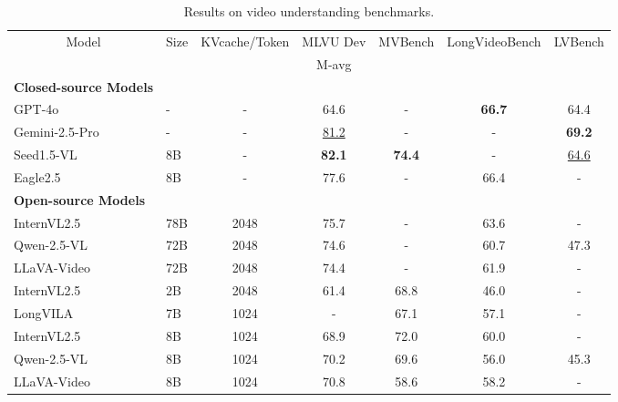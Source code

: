 \begin{table}[h]
    \caption{Results on video understanding benchmarks.} 
    \centering
    \addtolength\tabcolsep{-2.4pt}
    \small  %
    \renewcommand{\arraystretch}{0.92}  %
    \begin{tabular}{llc|c|c|c|c}
    \toprule
    \multicolumn{1}{c}{\multirow{2}{*}{Model}} & 
    \multicolumn{1}{c}{\multirow{2}{*}{Size}} & 
    \multicolumn{1}{c}{\multirow{2}{*}{KVcache/Token}} & 
    \multicolumn{1}{c|}{MLVU Dev} &  
    \multicolumn{1}{c|}{\multirow{2}{*}{MVBench}} & 
    \multicolumn{1}{c|}{\multirow{2}{*}{LongVideoBench}} & 
    \multicolumn{1}{c|}{\multirow{2}{*}{LVBench}} \\
    
    \multicolumn{1}{c}{} & \multicolumn{1}{c}{} & \multicolumn{1}{c}{} & M-avg & \multicolumn{1}{c|}{} & \multicolumn{1}{c|}{} & \multicolumn{1}{c|}{} \\ 
    \midrule
    \textbf{Closed-source Models} \\
    
    GPT-4o  & -  & - & {64.6}  & - &\textbf{66.7} & 64.4 \\
    Gemini-2.5-Pro & - & - & \underline{81.2} & - & - & \textbf{69.2} \\
    Seed1.5-VL & 8B  & - & \textbf{82.1} &\textbf{74.4} & - &  \underline{64.6} \\
    Eagle2.5 & 8B & -  & 77.6 & - & 66.4 & {-} \\
    
    \midrule
    \textbf{Open-source Models}\\ 
    
    InternVL2.5\cite{chen2025expandingperformanceboundariesopensource} & 78B & 2048  & 75.7  & - & 63.6  & {-} \\
    Qwen-2.5-VL\cite{bai2025qwen25vltechnicalreport} & 72B & 2048  & 74.6  & - & 60.7 & {47.3} \\
    LLaVA-Video\cite{zhang2024video} & 72B & 2048  & 74.4  & - & 61.9 & {-} \\
    InternVL2.5 &2B & 2048& 61.4&68.8& 46.0& - \\
    LongVILA\cite{chen2024longvila}& 7B & 1024  & - & 67.1 &57.1  & {-} \\
    InternVL2.5 & 8B & 1024 & {68.9} &72.0 & 60.0  & {-} \\
    Qwen-2.5-VL & 8B & 1024& 70.2 & 69.6 & 56.0 & {45.3} \\
    LLaVA-Video & 8B & 1024 & 70.8 & 58.6 & 58.2  & {-} \\
    

\end{tabular}
\end{table}
